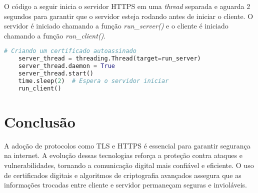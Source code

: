 \documentclass[a4paper,12pt]{article}
\begin{document}
O código a seguir inicia o servidor HTTPS em uma \textit{thread} separada e aguarda 2 segundos para garantir que o servidor esteja rodando antes de iniciar o cliente. O servidor é iniciado chamando a função \textit{run\_server()} e o cliente é iniciado chamando a função \textit{run\_client()}.
\begin{lstlisting}[language=Python]
    # Criando um certificado autoassinado
    server_thread = threading.Thread(target=run_server)
    server_thread.daemon = True
    server_thread.start()
    time.sleep(2)  # Espera o servidor iniciar
    run_client()
\end{lstlisting}

\section{Conclusão}
A adoção de protocolos como TLS e HTTPS é essencial para garantir segurança na internet. A evolução dessas tecnologias reforça a proteção contra ataques e vulnerabilidades, tornando a comunicação digital mais confiável e eficiente. O uso de certificados digitais e algoritmos de criptografia avançados assegura que as informações trocadas entre cliente e servidor permaneçam seguras e invioláveis.
\end{document}
